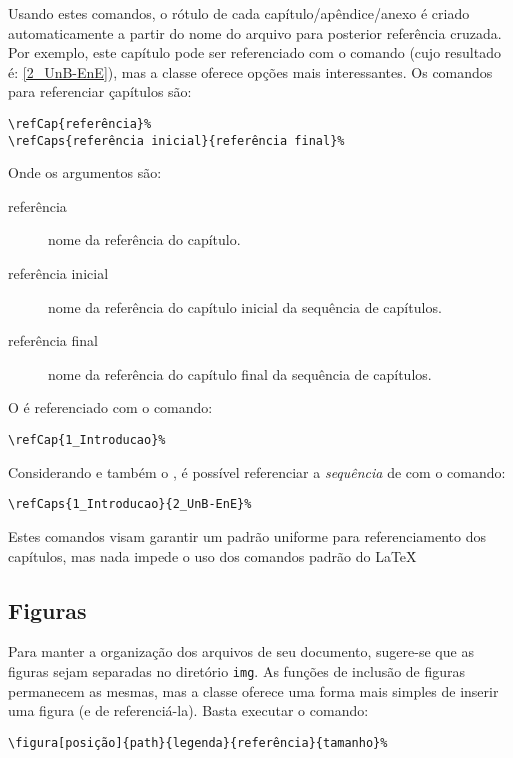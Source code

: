 Usando estes comandos, o rótulo de cada capítulo/apêndice/anexo é criado automaticamente a partir 
do nome do arquivo para posterior referência cruzada. Por exemplo, este capítulo pode ser 
referenciado com o comando  (cujo resultado é: \ref{2_UnB-EnE}), mas 
a classe oferece opções mais interessantes. Os comandos para referenciar çapítulos são:

\begin{verbatim}
\refCap{referência}%
\refCaps{referência inicial}{referência final}%
\end{verbatim}

Onde os argumentos são:
\begin{description}
	\item[referência] nome da referência do capítulo.
	\item[referência inicial] nome da referência do capítulo inicial da sequência de capítulos.
	\item[referência final] nome da referência do capítulo final da sequência de capítulos.
\end{description}

O  é referenciado com o comando:
\begin{verbatim}
\refCap{1_Introducao}%
\end{verbatim}

Considerando  e também o , é possível referenciar a 
\emph{sequência} de  com o comando:
\begin{verbatim}
\refCaps{1_Introducao}{2_UnB-EnE}%
\end{verbatim}

Estes comandos visam garantir um padrão uniforme para referenciamento dos capítulos, mas nada
impede o uso dos comandos padrão do \LaTeX\.

\subsection{Figuras}
Para manter a organização dos arquivos de seu documento, sugere-se que as figuras sejam separadas no
diretório \texttt{img}. As funções de inclusão de figuras permanecem as mesmas, mas a classe 
\unbene oferece uma forma mais simples de inserir uma figura (e de referenciá-la). Basta executar o 
comando:

\begin{verbatim}
\figura[posição]{path}{legenda}{referência}{tamanho}%
\end{verbatim}


